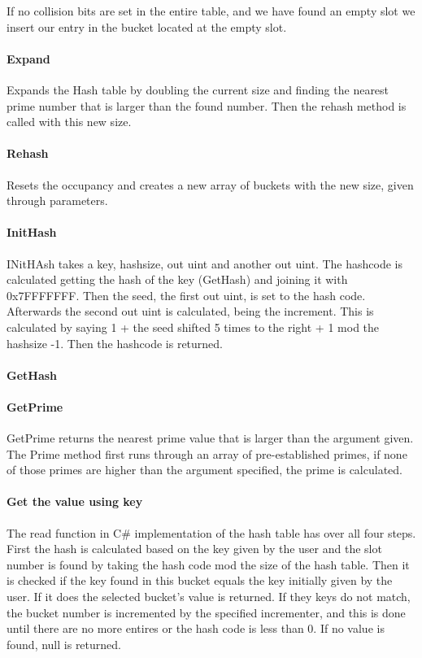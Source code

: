 \documentclass[titlepage]{article}
\begin{document}
	If no collision bits are set in the entire table, and we have found an empty slot we insert our entry in the bucket located at the empty slot. 
	
	
	
%	
	
	
	\paragraph{Expand}
	Expands the Hash table by doubling the current size and finding the nearest prime number that is larger than the found number. Then the rehash method is called with this new size. 
	
	\paragraph{Rehash}
	Resets the occupancy and creates a new array of buckets with the new size, given through parameters. 
	
	\paragraph{InitHash}
	INitHAsh takes a key, hashsize, out uint and another out uint. 
	The hashcode is calculated getting the hash of the key (GetHash) and joining it with 0x7FFFFFFF.
	Then the seed, the first out uint, is set to the hash code. 
	Afterwards the second out uint is calculated, being the increment. This is calculated by saying 1 + the seed shifted 5 times to the right + 1 mod the hashsize -1.
	Then the hashcode is returned. 
	
	
	\paragraph{GetHash}
	
	
	
	
	\paragraph{GetPrime} 
	GetPrime returns the nearest prime value that is larger than the argument given. 
	The Prime method first runs through an array of pre-established primes, if none of those primes are
	higher than the argument specified, the prime is calculated. 
	
	\paragraph{Get the value using key}
	The read function in C\# implementation of the hash table has over all four steps.
	First the hash is calculated based on the key given by the user and the slot number is found by taking the hash code mod the size of the hash table. 
	Then it is checked if the key found in this bucket equals the key initially given by the user. If it does the selected bucket's value is returned. 
	If they keys do not match, the bucket number is incremented by the specified incrementer, and this is done until there are no more entires or the hash code is less than 0. 
	If no value is found, null is returned. 
	
\end{document}
